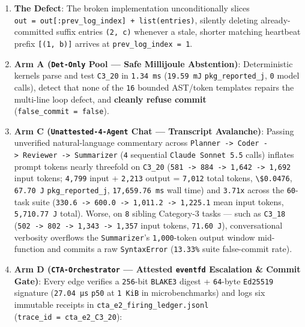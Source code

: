\documentclass[10pt,letterpaper]{article}
\newcounter{none}
\providecommand{\tightlist}{\setlength{\itemsep}{1pt}\setlength{\parskip}{0pt}}
\begin{document}
\begin{enumerate}
\def\labelenumi{\arabic{enumi}.}
\tightlist
\item
  \textbf{The Defect}: The broken implementation unconditionally slices
  \texttt{out\ =\ out{[}:prev\_log\_index{]}\ +\ list(entries)},
  silently deleting already-committed suffix entries
  \texttt{(2,\ \textquotesingle{}c\textquotesingle{})} whenever a stale,
  shorter matching heartbeat prefix
  \texttt{{[}(1,\ \textquotesingle{}b\textquotesingle{}){]}} arrives at
  \texttt{prev\_\allowbreak{}log\_\allowbreak{}index\ =\ 1}.
\item
  \textbf{Arm A (\texttt{Det-Only} Pool --- Safe Millijoule
  Abstention)}: Deterministic kernels parse and test \texttt{C3\_20} in
  \texttt{1.34\ ms} (\texttt{19.59\ mJ} \texttt{pkg\_\allowbreak{}reported\_\allowbreak{}j},
  \texttt{0} model calls), detect that none of the \texttt{16} bounded
  AST/token templates repairs the multi-line loop defect, and
  \textbf{cleanly refuse commit} (\texttt{false\_\allowbreak{}commit\ =\ false}).
\item
  \textbf{Arm C (\texttt{Unattested-\allowbreak{}4-\allowbreak{}Agent} Chat --- Transcript
  Avalanche)}: Passing unverified natural-language commentary across
  \texttt{Planner\ -\textgreater{}\ Coder\ -\textgreater{}\ Reviewer\ -\textgreater{}\ Summarizer}
  (\texttt{4} sequential \texttt{Claude\ Sonnet\ 5.\allowbreak{}5} calls) inflates
  prompt tokens nearly threefold on \texttt{C3\_20}
  (\texttt{581\ -\textgreater{}\ 884\ -\textgreater{}\ 1,642\ -\textgreater{}\ 1,692}
  input tokens; \texttt{4,799} input + \texttt{2,213} output =
  \texttt{7,012} total tokens, \texttt{\textbackslash{}\$0.0476},
  \texttt{67.70\ J} \texttt{pkg\_\allowbreak{}reported\_\allowbreak{}j}, \texttt{17,\allowbreak{}659.\allowbreak{}76\ ms}
  wall time) and \texttt{3.71x} across the \texttt{60}-task suite
  (\texttt{330.6\ -\textgreater{}\ 600.0\ -\textgreater{}\ 1,011.2\ -\textgreater{}\ 1,225.1}
  mean input tokens, \texttt{5,\allowbreak{}710.\allowbreak{}77\ J} total). Worse, on \texttt{8}
  sibling Category-3 tasks --- such as \texttt{C3\_18}
  (\texttt{502\ -\textgreater{}\ 802\ -\textgreater{}\ 1,343\ -\textgreater{}\ 1,357}
  input tokens, \texttt{71.60\ J}), conversational verbosity overflows
  the \texttt{Summarizer}'s \texttt{1,000}-token output window
  mid-function and commits a raw \texttt{SyntaxError} (\texttt{13.33\%}
  suite false-commit rate).
\item
  \textbf{Arm D (\texttt{CTA-\allowbreak{}Orchestrator} --- Attested \texttt{eventfd}
  Escalation \& Commit Gate)}: Every edge verifies a \texttt{256}-bit
  \texttt{BLAKE3} digest + \texttt{64}-byte \texttt{Ed25519} signature
  (\texttt{27.04\ µs} \texttt{p50} at \texttt{1\ KiB} in
  microbenchmarks) and logs six immutable receipts in
  \texttt{cta\_\allowbreak{}e2\_\allowbreak{}firing\_\allowbreak{}ledger.\allowbreak{}jsonl}
  (\texttt{trace\_\allowbreak{}id\ =\ cta\_\allowbreak{}e2\_\allowbreak{}C3\_\allowbreak{}20}):


\end{enumerate}
\end{document}
